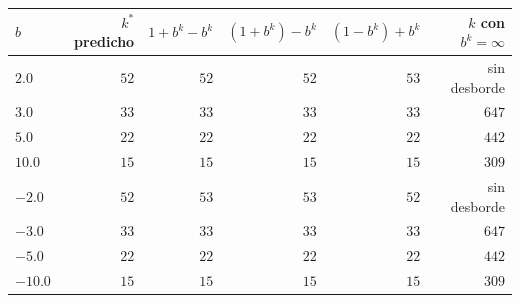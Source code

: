 \begin{tabular}{lrrrrr}
\toprule
$b$ & $k^\ast$ predicho & $1+b^k-b^k$ & $(1+b^k)-b^k$ & $(1-b^k)+b^k$ & $k$ con $b^k=\infty$ \\
\midrule
$2.0$ & $52$ & $52$ & $52$ & $53$ & sin desborde \\
$3.0$ & $33$ & $33$ & $33$ & $33$ & $647$ \\
$5.0$ & $22$ & $22$ & $22$ & $22$ & $442$ \\
$10.0$ & $15$ & $15$ & $15$ & $15$ & $309$ \\
$-2.0$ & $52$ & $53$ & $53$ & $52$ & sin desborde \\
$-3.0$ & $33$ & $33$ & $33$ & $33$ & $647$ \\
$-5.0$ & $22$ & $22$ & $22$ & $22$ & $442$ \\
$-10.0$ & $15$ & $15$ & $15$ & $15$ & $309$ \\
\bottomrule
\end{tabular}
